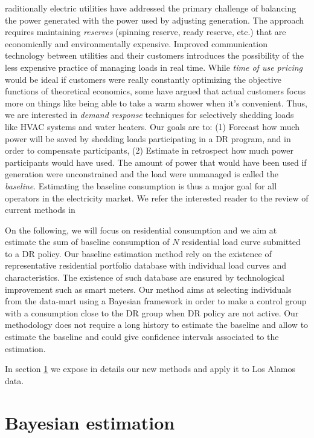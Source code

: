 \documentclass[journal]{IEEEtran}
\begin{document}
raditionally electric utilities have addressed the
primary challenge of balancing the power generated with the power used
by adjusting generation.  The approach requires maintaining
\emph{reserves} (spinning reserve, ready reserve, etc.) that are
economically and environmentally expensive.  Improved communication
technology between utilities and their customers introduces the
possibility of the less expensive practice of managing loads in real
time.  While \emph{time of use pricing} would be ideal if customers
were really constantly optimizing the objective functions of
theoretical economics, some have argued\cite{meyn} that actual
customers focus more on things like being able to take a warm shower
when it's convenient.  Thus, we are interested in \emph{demand
  response} techniques for selectively shedding loads like HVAC
systems and water heaters.  Our goals are to: (1) Forecast how much
power will be saved by shedding loads participating in a DR program,
and in order to compensate participants, (2) Estimate in retrospect
how much power participants would have used.  The amount of power that
would have been used if generation were unconstrained and the load
were unmanaged is called the \emph{baseline}.  Estimating the baseline
consumption is thus a major goal for all operators in the electricity
market. We refer the interested reader to the review of current
methods in \cite{directestimation}

On the following, we will focus on residential consumption and we aim
at estimate the sum of baseline consumption of $N$ residential load
curve submitted to a DR policy. Our baseline estimation method rely on
the existence of representative residential portfolio database with
individual load curves and characteristics. The existence of such
database are ensured by technological improvement such as smart
meters. Our method aims at selecting individuals from the data-mart
using a Bayesian framework in order to make a control group with a
consumption close to the DR group when DR policy are not active.  Our
methodology does not require a long history to estimate the baseline
and allow to estimate the baseline and could give confidence intervals
associated to the estimation.

In section \ref{sec:new} we expose
in details our new methods and apply it to Los Alamos data.


\section{Bayesian estimation}\label{sec:new}
\end{document}

